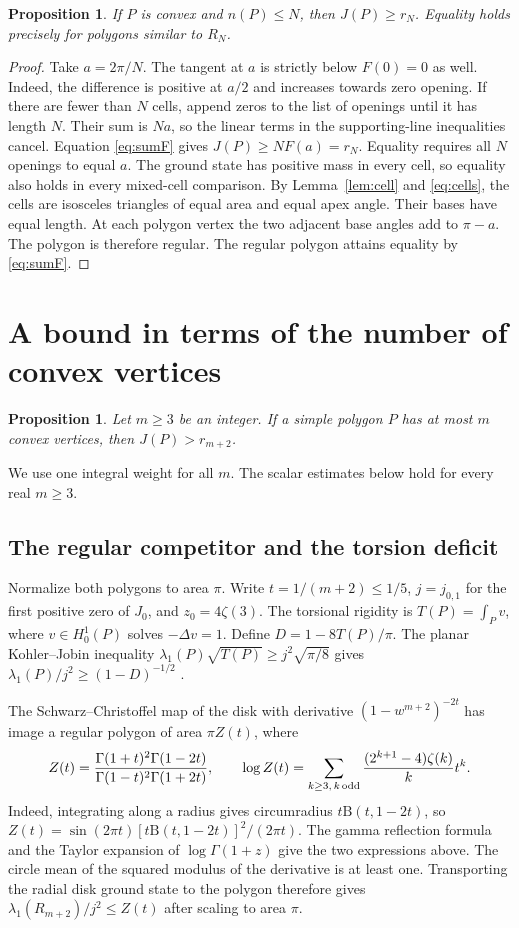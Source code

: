 \documentclass[11pt,a4paper,reqno]{amsart}
\newtheorem{proposition}[theorem]{Proposition}
\theoremstyle{remark}
\numberwithin{equation}{section}
\begin{document}
\begin{proposition}\label{prop:convex}
If $P$ is convex and $n(P)\le N$, then $J(P)\ge r_N$. Equality holds
precisely for polygons similar to $R_N$.
\end{proposition}
\begin{proof}
Take $a=2\pi/N$. The tangent at $a$ is strictly below $F(0)=0$ as well. Indeed, the difference is positive at $a/2$ and increases towards zero opening.
If there are fewer than $N$ cells, append zeros to the list of openings until it has length $N$. Their sum is $Na$,
so the linear terms in the supporting-line inequalities cancel. Equation
\eqref{eq:sumF} gives $J(P)\ge NF(a)=r_N$. Equality requires all $N$
openings to equal $a$. The ground state has positive mass in every cell, so
equality also holds in every mixed-cell comparison. By
Lemma~\ref{lem:cell} and \eqref{eq:cells}, the cells are isosceles triangles
of equal area and equal apex angle. Their bases have equal length. At each
polygon vertex the two adjacent base angles add to $\pi-a$. The polygon is
therefore regular. The regular polygon attains equality by \eqref{eq:sumF}.
\end{proof}

\section{A bound in terms of the number of convex vertices}\label{sec:turns}

\begin{proposition}\label{prop:turns}
Let $m\ge3$ be an integer. If a simple polygon $P$ has at most $m$ convex
vertices, then $J(P)>r_{m+2}$.
\end{proposition}

We use one integral weight for all $m$. The scalar estimates below hold for
every real $m\ge3$.

\subsection{The regular competitor and the torsion deficit}
Normalize both polygons to area $\pi$. Write $t=1/(m+2)\le1/5$,
$j=j_{0,1}$ for the first positive zero of $J_0$, and $z_0=4\zeta(3)$.
The torsional rigidity is $T(P)=\int_P v$, where $v\in H_0^1(P)$ solves
$-\Delta v=1$. Define $D=1-8T(P)/\pi$. The planar Kohler--Jobin inequality
$\lambda_1(P)\sqrt{T(P)}\ge j^2\sqrt{\pi/8}$ gives
$\lambda_1(P)/j^2\ge(1-D)^{-1/2}$ \cite{brasco}.

The Schwarz--Christoffel map of the disk with derivative
$(1-w^{m+2})^{-2t}$ has image a regular polygon of area $\pi Z(t)$, where
\[
 Z(t)=\frac{\Gamma(1+t)^2\Gamma(1-2t)}{\Gamma(1-t)^2\Gamma(1+2t)},\qquad
 \log Z(t)=\sum_{k\ge3,\,k\, {\rm odd}}\frac{(2^{k+1}-4)\zeta(k)}k t^k .
\]
Indeed, integrating along a radius gives circumradius $t\mathrm B(t,1-2t)$,
so $Z(t)=\sin(2\pi t)[t\mathrm B(t,1-2t)]^2/(2\pi t)$. The gamma reflection
formula and the Taylor expansion of $\log\Gamma(1+z)$ give the two
expressions above. The circle mean of the squared modulus of the derivative
is at least one. Transporting the radial disk ground state to the polygon
therefore gives $\lambda_1(R_{m+2})/j^2\le Z(t)$ after scaling to area $\pi$.
\end{document}
